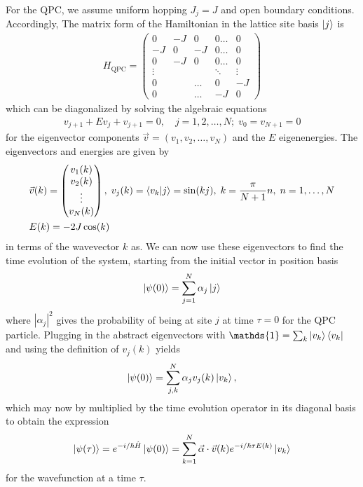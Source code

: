 \documentclass{article}
\newcommand{\Id}{\mathds{1}}
\begin{document}
For the QPC, we assume uniform hopping $J_j = J$ and open boundary conditions. Accordingly, 
The matrix form of the Hamiltonian in the lattice site basis $\ket{j}$ is 
\begin{align}
    H_{\text{QPC}} = 
    \begin{pmatrix}
        0 & -J  & 0 & 0 \hdots & 0 \\
        -J & 0  & -J & 0 \hdots & 0 \\
        0 & -J  & 0 & 0 \hdots  & 0 \\
        \vdots &  &  & \ddots & \vdots \\
        0 &  & \hdots & 0& -J \\
        0 &  & \hdots &  -J & 0 
    \end{pmatrix}
\end{align}
which can be diagonalized  by solving the algebraic equations 
\begin{align*}
    v_{j+1} + E v_j + v_{j+1} = 0 , \quad j = 1,2, \hdots , N ; \; v_0 =v_{N+1} = 0
\end{align*}
for the eigenvector components $\vec{v} = (v_1, v_2, \hdots, v_N)$ and the $E$ eigenenergies. 
The eigenvectors and energies are given by
\begin{align}\label{eq:tight_binding_sol}
   & \vec{v}(k) = \begin{pmatrix}
        v_1(k) \\
        v_2(k) \\
        \vdots \\
        v_N(k)
    \end{pmatrix} , \; v_j(k) = \bra{v_k}\ket{j} = \sin(k j), \; k=\frac{\pi}{N+1} n , 
    \; n = 1, \hdots , N \\
    & E(k) = -2J\cos(k)
\end{align}
in terms of the wavevector $k$ as. We can now use these eigenvectors to find the time evolution of the 
system, starting from the initial vector in position basis
\begin{align}\label{eq:qpc_gauss_lattice}
        \ket{\psi(0)} = \sum_{j=1}^N \alpha_j \ket{j}
\end{align}
where $|\alpha_j|^2$ gives the probability of being at site $j$ at time $\tau=0$ for the QPC particle. 
Plugging in the abstract eigenvectors with $\Id = \sum_k \ket{v_k}\bra{v_k}$ and using the definition 
of $v_j(k)$ yields
\begin{align*}
    \ket{\psi(0)} = \sum_{j,k}^N \alpha_j v_j(k)\ket{v_k},
\end{align*}
which may now by multiplied by the time evolution operator in its diagonal basis to obtain the expression
\begin{align}
    \ket{\psi(\tau)} = e^{-i/\hbar \hat{H}} \ket{\psi(0)} = 
            \sum_{k=1}^N \vec{\alpha}\cdot \vec{v}(k) e^{-i/\hbar\tau E(k)} \ket{v_k}
\end{align}
for the wavefunction at a time $\tau$.
\end{document}
